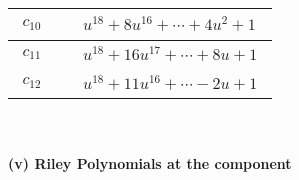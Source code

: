 \documentclass[1p]{elsarticle_modified}
\theoremstyle{definition}
\begin{document}
\begin{tabular}{m{50pt}|m{274pt}}
\hline $$\begin{aligned}c_{10}\end{aligned}$$&$\begin{aligned}
&u^{18}+8 u^{16}+\cdots+4 u^2+1
\end{aligned}$\\
\hline $$\begin{aligned}c_{11}\end{aligned}$$&$\begin{aligned}
&u^{18}+16 u^{17}+\cdots+8 u+1
\end{aligned}$\\
\hline $$\begin{aligned}c_{12}\end{aligned}$$&$\begin{aligned}
&u^{18}+11 u^{16}+\cdots-2 u+1
\end{aligned}$\\
\hline
\end{tabular}\\~\\
\newpage\renewcommand{\arraystretch}{1}
\flushleft \textbf{(v) Riley Polynomials at the component}\newline \\
\end{document}
